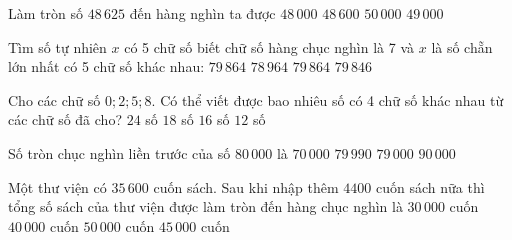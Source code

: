 \begin{ex} %
Làm tròn số $48\,625$ đến hàng nghìn ta được
\choice
{$48\,000$}
{$48\,600$}
{$50\,000$}
{\True $49\,000$}
\end{ex}

\begin{ex} %
Tìm số tự nhiên $x$ có 5 chữ số biết chữ số hàng chục nghìn là 7 và $x$ là số chẵn lớn nhất có 5 chữ số khác nhau:
\choice
{$79\,864$}
{$78\,964$}
{\True $79\,864$}
{$79\,846$}
\end{ex}

\begin{ex} %
Cho các chữ số $0; 2; 5; 8$. Có thể viết được bao nhiêu số có 4 chữ số khác nhau từ các chữ số đã cho?
\choice
{$24$ số}
{\True $18$ số}
{$16$ số}
{$12$ số}
\end{ex}

\begin{ex} %
Số tròn chục nghìn liền trước của số $80\,000$ là
\choice
{\True $70\,000$}
{$79\,990$}
{$79\,000$}
{$90\,000$}
\end{ex}

\begin{ex} %
Một thư viện có $35\,600$ cuốn sách. Sau khi nhập thêm $4400$ cuốn sách nữa thì tổng số sách của thư viện được làm tròn đến hàng chục nghìn là
\choice
{$30\,000$ cuốn}
{\True $40\,000$ cuốn}
{$50\,000$ cuốn}
{$45\,000$ cuốn}
\end{ex}

